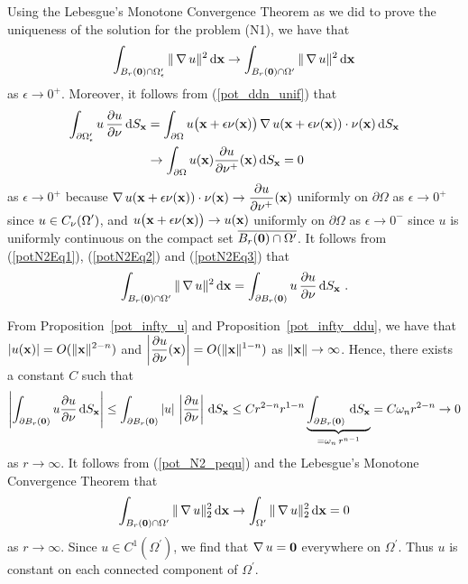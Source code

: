 Using the Lebesgue's Monotone Convergence Theorem as we did to prove
the uniqueness of the solution for the problem (N1), we have that
\begin{equation} \label{potN2Eq2}
\int_{B_r(\mathbf{0})\cap\Omega^{\prime}_\epsilon} \| \operatorname{\nabla} u \|^2 \,\mathrm{d}{\mathbf{x}}
\rightarrow \int_{B_r(\mathbf{0})\cap\Omega^{\prime}} \| \operatorname{\nabla} u \|^2 \,\mathrm{d}{\mathbf{x}}
\end{equation}
as $\epsilon \rightarrow 0^+$.
Moreover, it follows from (\ref{pot_ddn_unif}) that
\begin{equation} \label{potN2Eq3}
\begin{split}
\int_{\partial \Omega^{\prime}_\epsilon} u\,\frac{\partial{u}}{\partial \mathbf{\nu}} \,\mathrm{d}{S}_{\mathbf{x}}
&= \int_{\partial \Omega} u\big(\mathbf{x} + \epsilon \mathbf{\nu}(\mathbf{x})\big)
\operatorname{\nabla} u(\mathbf{x} + \epsilon \mathbf{\nu}(\mathbf{x})) \cdot
\mathbf{\nu}(\mathbf{x}) \,\mathrm{d}{S}_{\mathbf{x}} \\
&\rightarrow \int_{\partial \Omega} u(\mathbf{x}) \frac{\partial{u}}{\partial \mathbf{\nu}^+}(\mathbf{x})
\,\mathrm{d}{S}_{\mathbf{x}} = 0
\end{split}
\end{equation}
as $\epsilon \rightarrow 0^+$ because
$\displaystyle
\operatorname{\nabla} u(\mathbf{x} + \epsilon \mathbf{\nu}(\mathbf{x})) \cdot \mathbf{\nu}(\mathbf{x})
\to \frac{\partial{u}}{\partial \mathbf{\nu}^+}(\mathbf{x})$ uniformly on $\partial \Omega$ as
$\epsilon \to 0^+$ since
$\displaystyle u \in C_{\mathbf{\nu}}(\Omega^{\prime})$, and
$\displaystyle u\big(\mathbf{x} + \epsilon \mathbf{\nu}(\mathbf{x})\big) \to
u(\mathbf{x})$ uniformly on $\partial \Omega$ as $\epsilon \to 0^-$
since $u$ is uniformly continuous on the compact set
$\displaystyle\overline{B_r(\mathbf{0})\cap\Omega^{\prime}}$.
It follows from (\ref{potN2Eq1}), (\ref{potN2Eq2}) and
(\ref{potN2Eq3}) that 
\begin{equation} \label{pot_N2_pequ}
\int_{B_r(\mathbf{0})\cap\Omega^{\prime}} \| \operatorname{\nabla} u \|^2 \,\mathrm{d}{\mathbf{x}} =
\int_{\partial B_r(\mathbf{0})} u\,\frac{\partial{u}}{\partial \mathbf{\nu}} \,\mathrm{d}{S}_{\mathbf{x}} \  .
\end{equation}

 From Proposition~\ref{pot_infty_u} and
Proposition~\ref{pot_infty_ddu}, we have that
$\displaystyle |u(\mathbf{x})| = O(\|\mathbf{x}\|^{2-n})$ and
$\displaystyle \left| \frac{\partial{u}}{\partial \mathbf{\nu}}(\mathbf{x})\right|
= O(\|\mathbf{x}\|^{1-n})$ as $\|\mathbf{x}\|\rightarrow \infty$.  Hence,
there exists a constant $C$ such that
\[
\left| \int_{\partial B_r(\mathbf{0})} u \frac{\partial{u}}{\partial \mathbf{\nu}} \,\mathrm{d}{S}_{\mathbf{x}}
\right| \leq
\int_{\partial B_r(\mathbf{0})} \left| u \right|\,\left| \frac{\partial{u}}{\partial \mathbf{\nu}} \right|
\,\mathrm{d}{S}_{\mathbf{x}}
\leq C r^{2-n} r^{1-n}
\underbrace{\int_{\partial B_r(\mathbf{0})} \,\mathrm{d}{S}_{\mathbf{x}}}_{=\omega_n \,r^{n-1}}
= C \omega_n r^{2-n} \rightarrow 0 
\]
as $r \rightarrow \infty$.
It follows from (\ref{pot_N2_pequ}) and the Lebesgue's Monotone
Convergence Theorem that
\[
\int_{B_r(\mathbf{0})\cap\Omega^{\prime}} \| \operatorname{\nabla} u \|_2^2 \,\mathrm{d}{\mathbf{x}} \rightarrow
\int_{\Omega^{\prime}} \| \operatorname{\nabla} u \|_2^2 \,\mathrm{d}{\mathbf{x}} = 0
\]
as $r \rightarrow \infty$.
Since $\displaystyle u \in C^1(\Omega^{\prime})$, we find that
$\operatorname{\nabla} u = \mathbf{0}$ everywhere on $\displaystyle \Omega^{\prime}$.
Thus $u$ is constant on each connected component of $\Omega^{\prime}$.

